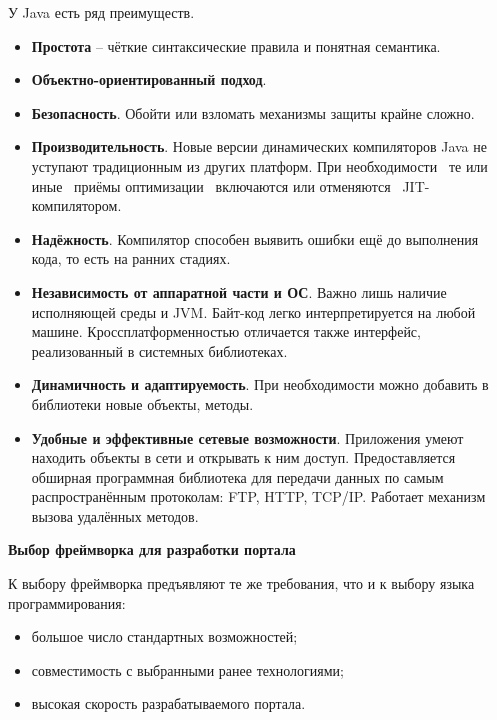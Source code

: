 У Java есть ряд преимуществ.
\begin{itemize}
	\item \textbf{Простота} -- чёткие синтаксические правила и понятная семантика.
	
	\item \textbf{Объектно-ориентированный подход}.
	
	\item \textbf{Безопасность}. Обойти или взломать механизмы защиты крайне сложно.
	
	\item \textbf{Производительность}. Новые версии динамических компиляторов Java не уступают традиционным из других платформ. При необходимости \, те или иные \, приёмы оптимизации \, включаются или отменяются \, JIT-компилятором.
	
	\item \textbf{Надёжность}. Компилятор способен выявить ошибки ещё до выполнения кода, то есть на ранних стадиях.
	
	\item \textbf{Независимость от аппаратной части и ОС}. Важно лишь наличие исполняющей среды и JVM. Байт-код легко интерпретируется на любой машине. Кроссплатформенностью отличается также интерфейс, реализованный в системных библиотеках.
	
	\item \textbf{Динамичность и адаптируемость}. При необходимости можно добавить в библиотеки новые объекты, методы.
	
	\item \textbf{Удобные и эффективные сетевые возможности}. Приложения умеют находить объекты в сети и открывать к ним доступ. Предоставляется обширная программная библиотека для передачи данных по самым распространённым протоколам: FTP, HTTP, TCP/IP. Работает механизм вызова удалённых методов. \\
\end{itemize}

\textbf{Выбор фреймворка для разработки портала}

К выбору фреймворка предъявляют те же требования, что и к выбору языка программирования:
\begin{itemize}
	\item большое число стандартных возможностей;
	
	\item совместимость с выбранными ранее технологиями;
	
	\item высокая скорость разрабатываемого портала.
\end{itemize}

